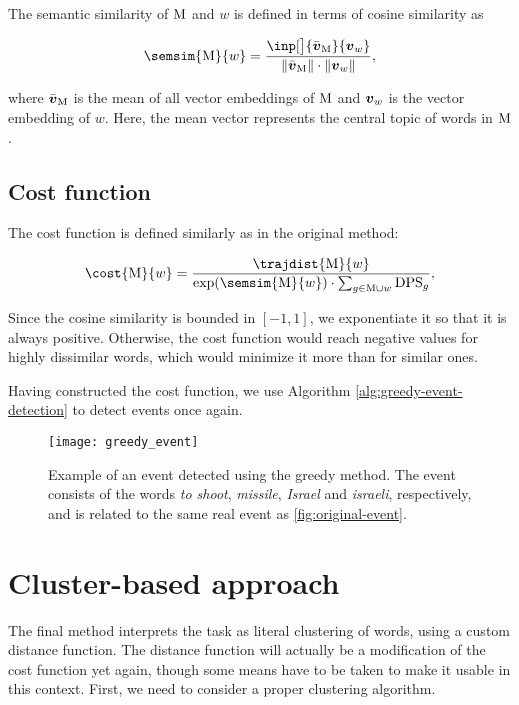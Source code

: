 The semantic similarity of $\text{M}$ and $w$ is defined in terms of cosine similarity as

\begin{equation}
	\semsim{\featset}{w} = \frac{\inp[\big]{\bar{\embed}_{\featset}}{\embed_{w}}}{\| \bar{\embed}_{\featset} \| \cdot \| \embed_{w} \|},
\end{equation}

where $\bar{\embed}_{\featset}$ is the mean of all vector embeddings of $\text{M}$ and $\embed_{w}$ is the vector embedding of $w$. Here, the mean vector represents the central topic of words in $\text{M}$.


\subsection{Cost function}
The cost function is defined similarly as in the original method:

\begin{equation} \label{eq:cost-function}
	\cost{\featset}{w} = \frac{\trajdist{\featset}{w}}{\exp(\semsim{\featset}{w}) \cdot \sum_{g \in \featset \cup w}{\text{DPS}_{g}}},
\end{equation}

Since the cosine similarity is bounded in $[-1, 1]$, we exponentiate it so that it is always positive. Otherwise, the cost function would reach negative values for highly dissimilar words, which would minimize it more than for similar ones.

Having constructed the cost function, we use Algorithm \ref{alg:greedy-event-detection} to detect events once again.


\begin{figure}[H]
  \centering
  \texttt{[image: greedy\_event]}  %
  \caption{Example of an event detected using the greedy method. The event consists of the words \textit{to shoot}, \textit{missile}, \textit{Israel} and \textit{israeli}, respectively, and is related to the same real event as \autoref{fig:original-event}.}
  \label{fig:greedy-event}
\end{figure}


\section{Cluster-based approach}
The final method interprets the task as literal clustering of words, using a custom distance function. The distance function will actually be a modification of the cost function yet again, though some means have to be taken to make it usable in this context. First, we need to consider a proper clustering algorithm.

